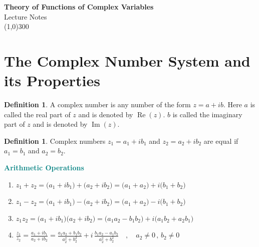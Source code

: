 \documentclass[11pt,a4paper]{article}
\theoremstyle{definition}
\newtheorem{definition}[thm]{Definition}
\begin{document}
\begin{titlepage}
\begin{center}
\vspace*{4cm}
{\Huge\bfseries Theory of Functions of Complex Variables}\\[1.2cm]
{\large Lecture Notes}\\[3cm]
\line(1,0){300}
\end{center}
\end{titlepage}







\textcolor{teal}\tableofcontents
\thispagestyle{empty}
\clearpage
\setcounter{page}{1}









\pagebreak
{\color[wave]{485}\section{The Complex Number System and its Properties}}

\begin{definition}
A complex number is any number of the form $z = a + ib$.
Here $a$ is called the real part of $z$ and is denoted by $\operatorname{Re}(z)$.
$b$ is called the imaginary part of $z$ and is denoted by $\operatorname{Im} (z)$.
\end{definition}

\begin{definition}
Complex numbers $z_1 = a_1 + ib_1$ and $z_2 = a_2 + ib_2$ are equal if $a_1 = b_1$ and $a_2 = b_2$.
\end{definition}

\textbf{\textcolor{teal}{Arithmetic Operations}}

\begin{enumerate}
\item $z_1 + z_2 = \big(a_1 + ib_1\big) + \big(a_2 + ib_2\big) = \big(a_1+a_2\big) + i\big(b_1 + b_2\big)$
\item $z_1 - z_2 = \big(a_1 + ib_1\big) - \big(a_2 + ib_2\big) = \big(a_1+a_2\big) - i\big(b_1 + b_2\big)$
\item $z_1z_2 = \big(a_1 + ib_1\big)\big(a_2 + ib_2\big) = \big(a_1a_2 - b_1b_2\big) + i \big(a_1b_2 + a_2b_1\big)$

\item $\frac{z_1}{z_2} = \frac{a_1 + ib_1}{a_2 + ib_2} = \frac{a_1a_2 + b_1b_2}{a_2^2 + b_2^2} + i \,\frac{b_1a_2 - a_1b_2}{a_2^2 + b_2^2}\quad , \quad  a_2\neq 0\,,\, b_2\neq 0$\\
\end{enumerate}
\end{document}

